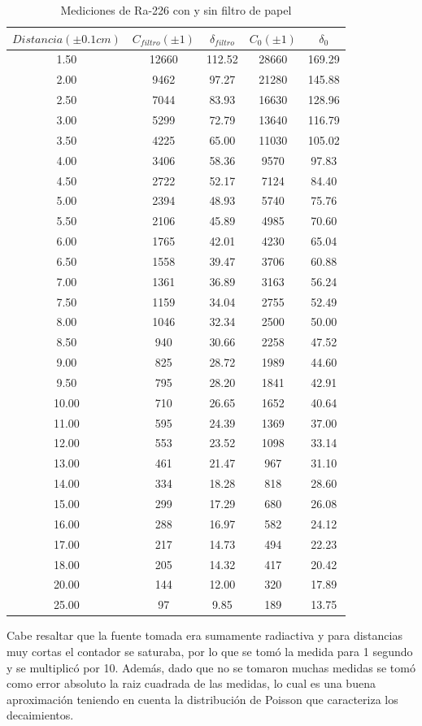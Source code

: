 \documentclass[%
 reprint,
 amsmath,amssymb,
 aps,
]{revtex4-1}
\begin{document}
\begin{table}[h!]
\centering
 \begin{tabular}{|c|c|c|c|c|} 
 \hline
 $Distancia(\pm0.1cm)$& $C_{filtro}(\pm1)$& $\delta_{filtro}$ & $C_{0}(\pm1)$ & $\delta_0$ \\ [0.5ex] 
 \hline\hline
 1.50&12660&112.52&28660&169.29\\
 2.00&9462&97.27&21280&145.88\\
 2.50&7044&83.93&16630&128.96\\
 3.00&5299&72.79&13640&116.79\\
 3.50&4225&65.00&11030&105.02\\
 4.00&3406&58.36&9570&97.83\\
 4.50&2722&52.17&7124&84.40\\
 5.00&2394&48.93&5740&75.76\\
 5.50&2106&45.89&4985&70.60\\
 6.00&1765&42.01&4230&65.04\\
 6.50&1558&39.47&3706&60.88\\
 7.00&1361&36.89&3163&56.24\\
 7.50&1159&34.04&2755&52.49\\
 8.00&1046&32.34&2500&50.00\\
 8.50&940&30.66&2258&47.52\\
 9.00&825&28.72&1989&44.60\\
 9.50&795&28.20&1841&42.91\\
 10.00&710&26.65&1652&40.64\\
 11.00&595&24.39&1369&37.00\\
 12.00&553&23.52&1098&33.14\\
 13.00&461&21.47&967&31.10\\
 14.00&334&18.28&818&28.60\\
 15.00&299&17.29&680&26.08\\
 16.00&288&16.97&582&24.12\\
 17.00&217&14.73&494&22.23\\
 18.00&205&14.32&417&20.42\\
 20.00&144&12.00&320&17.89\\
 25.00&97&9.85&189&13.75\\
 [1ex] 
 \hline
 \end{tabular}
 \caption{Mediciones de Ra-226 con y sin filtro de papel}
 \label{table:alcance}
\end{table}

Cabe resaltar que la fuente tomada era sumamente radiactiva y para distancias muy cortas el contador se saturaba, por lo que se tomó la medida para 1 segundo y se multiplicó por 10. Además, dado que no se tomaron muchas medidas se tomó como error absoluto la raiz cuadrada de las medidas, lo cual es una buena aproximación teniendo en cuenta la distribución de Poisson que caracteriza los decaimientos.\\
\end{document}

